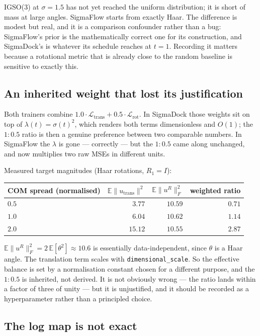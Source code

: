 \documentclass[11pt,a4paper]{report}
\theoremstyle{definition}
\theoremstyle{remark}
\newcommand{\EE}{\mathbb E}
\begin{document}
IGSO(3) at $\sigma=1.5$ has not yet reached the uniform distribution; it is
short of mass at large angles. SigmaFlow starts from exactly Haar. The
difference is modest but real, and it is a comparison confounder rather than
a bug: SigmaFlow's prior is the mathematically correct one for its
construction, and SigmaDock's is whatever its schedule reaches at $t=1$.
Recording it matters because a rotational metric that is already close to the
random baseline is sensitive to exactly this.

\subsection{An inherited weight that lost its justification}
\label{sec:engine-weights}

Both trainers combine $1.0\cdot\mathcal L_{\text{trans}} +
0.5\cdot\mathcal L_{\text{rot}}$. In SigmaDock those weights sit on top of
$\lambda(t)=\sigma(t)^2$, which renders both terms dimensionless and
$O(1)$; the $1{:}0.5$ ratio is then a genuine preference between two
comparable numbers. In SigmaFlow the $\lambda$ is gone --- correctly --- but
the $1{:}0.5$ came along unchanged, and now multiplies two raw MSEs in
different units.

Measured target magnitudes (Haar rotations, $R_1=I$):
\begin{center}
\begin{tabular}{lrrr}
\toprule
COM spread (normalised) & $\EE\|u_{\text{trans}}\|^2$ & $\EE\|u^R\|_F^2$ & weighted ratio \\
\midrule
$0.5$ & $3.77$ & $10.59$ & $0.71$ \\
$1.0$ & $6.04$ & $10.62$ & $1.14$ \\
$2.0$ & $15.12$ & $10.55$ & $2.87$ \\
\bottomrule
\end{tabular}
\end{center}
$\EE\|u^R\|_F^2 = 2\,\EE[\theta^2]\approx10.6$ is essentially
data-independent, since $\theta$ is a Haar angle. The translation term scales
with \texttt{dimensional\_scale}. So the effective balance is set by a
normalisation constant chosen for a different purpose, and the $1{:}0.5$ is
inherited, not derived. It is not obviously wrong --- the ratio lands within a
factor of three of unity --- but it is unjustified, and it should be recorded
as a hyperparameter rather than a principled choice.

\subsection{The log map is not exact}
\label{sec:engine-logmap}
\end{document}
